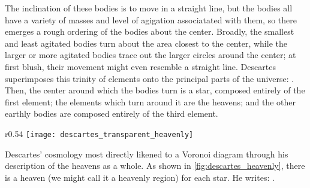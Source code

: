 \documentclass[12pt,twoside]{reedthesis}
\begin{document}
    The inclination of these  bodies is to move in a straight line, but the bodies all have a variety of masses and level of agigation associatated with them, so there emerges a rough ordering of the bodies about the center. Broadly, the smallest and least agitated bodies turn about the area closest to the center, while the larger or more agitated bodies trace out the larger circles around the center; at first blush, their movement might even resemble a straight line. Descartes superimposes this trinity of elements onto the principal parts of the universe: \citep[][p. 20]{descartes}. Then, the center around which the bodies turn is a star, composed entirely of the first element; the elements which turn around it are the heavens; and the other earthly bodies are composed entirely of the third element.\par


    \begin{wrapfigure}{r}{0.54\textwidth}
      \centering
      \texttt{[image: descartes\_transparent\_heavenly]}
      \caption{Descartes' Heavenly Regions}
      \label{fig:descartes_heavenly}
    \end{wrapfigure}


   Descartes' cosmology most directly likened to a Voronoi diagram through his description of the heavens as a whole. As shown in \cref{fig:descartes_heavenly}, there is a heaven (we might call it a heavenly region) for each star. He writes: \citep[][p. 35]{descartes}.\par
\end{document}
